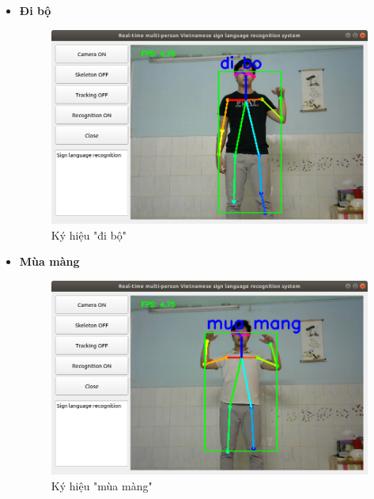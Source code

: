 \documentclass[12pt,a4paper,oneside]{book}
\numberwithin{equation}{chapter} %
\numberwithin{figure}{chapter} %
\numberwithin{table}{chapter} %
\begin{document}
\begin{itemize}
\item \textbf{Đi bộ}
\FloatBarrier
\begin{figure}[htp]
\begin{center}
\includegraphics[scale=0.4]{kq/di_bo.png}
\end{center}
\caption{Ký hiệu "đi bộ"}
\end{figure}
\FloatBarrier

\thispagestyle{phuluc}
\pagebreak
\item \textbf{Mùa màng}
\FloatBarrier
\begin{figure}[htp]
\begin{center}
\includegraphics[scale=0.4]{kq/mua_mang.png}
\end{center}
\caption{Ký hiệu "mùa màng"}
\end{figure}
\FloatBarrier


\end{itemize}
\end{document}
